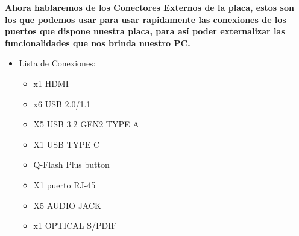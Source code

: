 \documentclass{article}
\begin{document}
\normalsize
  {\bfseries Ahora hablaremos de los \textbf{Conectores Externos} de la placa, estos son los que podemos usar para usar rapidamente las conexiones de los puertos que dispone nuestra placa, para así poder 
  externalizar las funcionalidades que nos brinda nuestro PC. }%
  \begin{itemize}
    \item Lista de Conexiones:

    \begin{minipage}{0.5\textwidth}
      \begin{itemize}%
        \item x1 HDMI
        \item x6 USB 2.0/1.1
        \item X5 USB 3.2 GEN2 TYPE A
        \item X1 USB TYPE C
        \item Q-Flash Plus button
        \item X1 puerto RJ-45
        \item X5 AUDIO JACK 
        \item x1 OPTICAL S/PDIF 
      \end{itemize}
    \end{minipage}
    \begin{minipage}{\textwidth}

\end{minipage}
\end{itemize}
\end{document}
